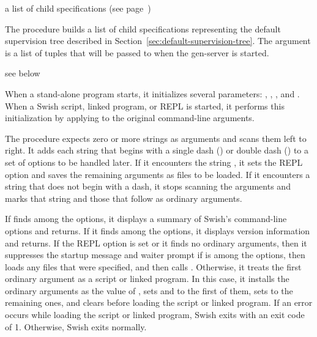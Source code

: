 \begin{procedure}
\end{procedure}
\returns{} a list of child specifications (see page~\pageref{page:child-spec})

The  procedure builds a list of child specifications
representing the default supervision tree described in
Section~\ref{sec:default-supervision-tree}.
The  argument is a list of  tuples that will
be passed to  when the  gen-server is started.

\begin{procedure}
\end{procedure}
\returns{} see below

When a stand-alone program starts, it initializes several parameters:
, , , and
.
When a Swish script, linked program, or REPL is started, it performs this
initialization by applying  to the original command-line
arguments.

The  procedure expects zero or more strings as arguments
and scans them left to right.
It adds each string that begins with a single dash (\sopt{}) or double dash
(\lopt{}) to a set of options to be handled later.
If it encounters the string \str{\lopt{}}, it sets the REPL option and
saves the remaining arguments as files to be loaded.
If it encounters a string that does not begin with a dash, it stops scanning
the arguments and marks that string and those that follow as ordinary
arguments.

If  finds  among the options,
it displays a summary of Swish's command-line options and returns.
If it finds  among the options,
it displays version information and returns.
If the REPL option is set or it finds no ordinary arguments, then it
suppresses the startup message and waiter prompt 
if  is among the options,
then loads any files that were specified,
and then calls . 
Otherwise, it treats the first ordinary argument as a script or linked program.
In this case, it installs the ordinary arguments as
the value of ,
sets  and  to the first of them,
sets  to the remaining ones,
and clears 
before loading the script or linked program.
If an error occurs while loading the script or linked program,
Swish exits with an exit code of 1.
Otherwise, Swish exits normally.

